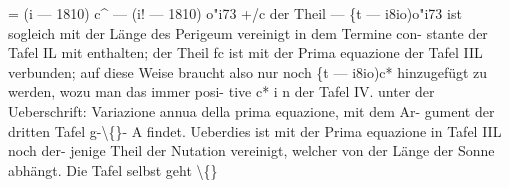 \documentclass[12pt,a4paper]{article}
\begin{document}
= (i --- 1810) c\^{} --- (i! --- 1810) o"i73 +/c\newline
der Theil --- \{t --- i8io)o"i73 ist sogleich mit der Länge des Perigeum vereinigt in dem Termine con-\newline
stante der Tafel IL mit enthalten; der Theil fc ist mit der Prima equazione der Tafel IIL verbunden;\newline
auf diese Weise braucht also nur noch \{t --- i8io)c* hinzugefügt zu werden, wozu man das immer posi-\newline
tive c* i n der Tafel IV. unter der Ueberschrift: Variazione annua della prima equazione, mit dem Ar-\newline
gument der dritten Tafel g-\textbackslash\{\}- A findet. Ueberdies ist mit der Prima equazione in Tafel IIL noch der-\newline
jenige Theil der Nutation vereinigt, welcher von der Länge der Sonne abhängt. Die Tafel selbst geht \textbackslash\{\}\newline
\end{document}
